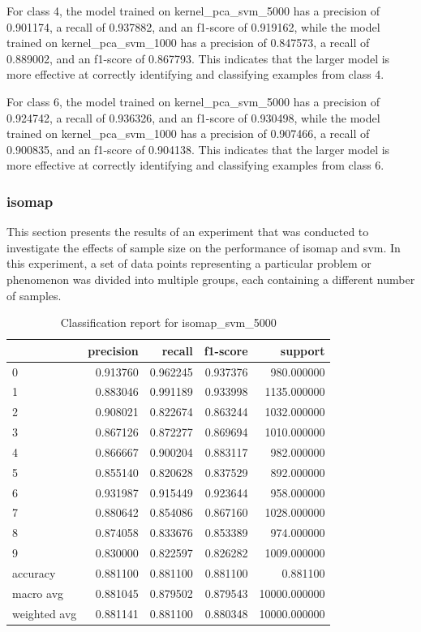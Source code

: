 For class 4, the model trained on kernel_pca_svm_5000 has a precision of 0.901174, a recall of 0.937882, and an f1-score of 0.919162, while the model trained on kernel_pca_svm_1000 has a precision of 0.847573, a recall of 0.889002, and an f1-score of 0.867793. This indicates that the larger model is more effective at correctly identifying and classifying examples from class 4.

For class 6, the model trained on kernel_pca_svm_5000 has a precision of 0.924742, a recall of 0.936326, and an f1-score of 0.930498, while the model trained on kernel_pca_svm_1000 has a precision of 0.907466, a recall of 0.900835, and an f1-score of 0.904138. This indicates that the larger model is more effective at correctly identifying and classifying examples from class 6.

\subsubsection{\gls{isomap}}\label{subsubsec:experiment_4_isomap}
This section presents the results of an experiment that was conducted to investigate the effects of sample size on the performance of \gls{isomap} and \gls{svm}. In this experiment, a set of data points representing a particular problem or phenomenon was divided into multiple groups, each containing a different number of samples.
\begin{table}[htb!]
    \centering
    \caption{Classification report for isomap_svm_5000}
    \label{tab:classification-report-isomap_svm_5000}
    \begin{tabular}{lrrrr}
    \toprule
     & precision & recall & f1-score & support \\
    \midrule
    0 & 0.913760 & 0.962245 & 0.937376 & 980.000000 \\
    1 & 0.883046 & 0.991189 & 0.933998 & 1135.000000 \\
    2 & 0.908021 & 0.822674 & 0.863244 & 1032.000000 \\
    3 & 0.867126 & 0.872277 & 0.869694 & 1010.000000 \\
    4 & 0.866667 & 0.900204 & 0.883117 & 982.000000 \\
    5 & 0.855140 & 0.820628 & 0.837529 & 892.000000 \\
    6 & 0.931987 & 0.915449 & 0.923644 & 958.000000 \\
    7 & 0.880642 & 0.854086 & 0.867160 & 1028.000000 \\
    8 & 0.874058 & 0.833676 & 0.853389 & 974.000000 \\
    9 & 0.830000 & 0.822597 & 0.826282 & 1009.000000 \\
    accuracy & 0.881100 & 0.881100 & 0.881100 & 0.881100 \\
    macro avg & 0.881045 & 0.879502 & 0.879543 & 10000.000000 \\
    weighted avg & 0.881141 & 0.881100 & 0.880348 & 10000.000000 \\
    \bottomrule
    \end{tabular}
    \end{table}
    
